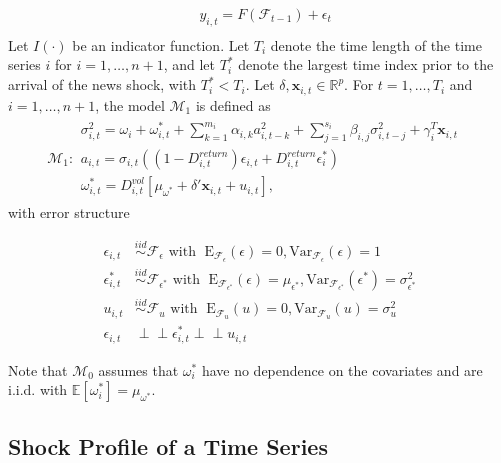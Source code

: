 \documentclass[11pt]{article}
\newcommand{\x}{\textbf{x}}
\newcommand{\simiid}{\stackrel{iid}{\sim}} %
\newcommand{\indep}{\perp \!\!\! \perp } %
\def\mrm#1{\mathrm{#1}} %
\def\mc#1{\mathcal{#1}} %
\def\E{\mathbb{E}} %
\def\mc#1{\mathcal{#1}}
\theoremstyle{definition}
\begin{document}
\begin{align*}
&y_{i,t} = F(\mathcal{F}_{t-1}) + \epsilon_{t}\\
\end{align*}
Let $I(\cdot)$ be an indicator function.  Let $T_i$ denote the time length of the time series $i$ for $i = 1, \ldots, n+1$, and let $T_i^*$ denote the largest time index prior to the arrival of the news shock, with $T_i^* < T_i$.  Let $\delta, \x_{i,t} \in \mathbb{R}^{p}$.  For $t= 1, \ldots, T_i$ and $i = 1, \ldots, n+1$, the model $\mc{M}_1$ is defined as 
\begin{align*}
  \mc{M}_1 \colon \begin{array}{l}
     \sigma^{2}_{i,t} = \omega_{i} + \omega^{*}_{i,t} + \sum^{m_{i}}_{k=1}\alpha_{i,k}a^{2}_{i,t-k} + \sum_{j=1}^{s_{i}}\beta_{i,j}\sigma_{i,t-j}^{2} + \gamma_{i}^{T} \x_{i,t} \text{ }\\[.2cm]
     a_{i,t} = \sigma_{i,t}((1-D^{return}_{i,t})\epsilon_{i,t} + D^{return}_{i,t}\epsilon^{*}_{i})\\[.2cm]
    \omega_{i,t}^{*} = D^{vol}_{i,t}[\mu_{\omega^{*}}+\delta'\x_{i,t}+ u_{i,t}],
  \end{array}
  \end{align*}
with error structure

  \begin{align*}
    \epsilon_{i,t} &\simiid \mc{F}_{\epsilon} \text{ with }  \; \mrm{E}_{\mc{F}_{\epsilon}}(\epsilon) = 0, \mrm{Var}_{\mc{F}_{\epsilon}}(\epsilon)  = 1  \\
    \epsilon^{*}_{i,t} &\simiid \mc{F}_{\epsilon^{*}} \text{ with }  \; \mrm{E}_{\mc{F}_{\epsilon^{*}}}(\epsilon) = \mu_{\epsilon^{*}}, \mrm{Var}_{\mc{F}_{\epsilon^{*}}}(\epsilon^{*})  = \sigma^2_{\epsilon^{*}}  \\
    u_{i,t} & \simiid  \mc{F}_{u} \text{ with }  \; \mrm{E}_{\mc{F}_{u}}(u) = 0, \mrm{Var}_{\mc{F}_{u}}(u) = \sigma^2_{u}\\
    \epsilon_{i,t} & \indep  \epsilon^{*}_{i,t}  \indep u_{i,t}
    \end{align*}
 
    Note that $\mc{M}_{0}$ assumes that $\omega^{*}_i$ have no dependence on the covariates and are i.i.d. with $\E[ \omega^{*}_i]=\mu_{\omega^{*}}$.  


    \subsection{Shock Profile of a Time Series}
    \label{Shock Profile of a Time Series}
    
\end{document}
